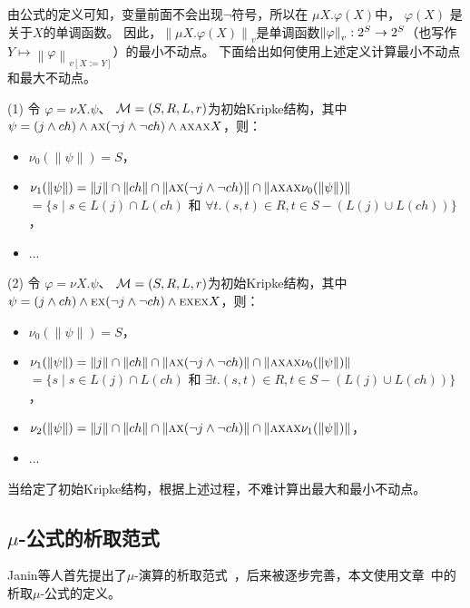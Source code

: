 由公式的定义可知，变量前面不会出现$\neg$符号，所以在 $\mu X. \varphi(X)$中， $\varphi(X)$ 是关于$X$的单调函数。
因此，$\left\| \mu X. \varphi(X)\right\|_v$是单调函数$\left\| \varphi \right\|_{v}: 2^S\rightarrow 2^S$（也写作$Y \mapsto \left\| \varphi\right\|_{v[X:=Y]}$）的最小不动点。
下面给出如何使用上述定义计算最小不动点和最大不动点。
\begin{example}
	(1) 令 $\varphi=\nu X. \psi$、 ${\cal M}=(S, R, L,r)$为初始Kripke结构，其中$\psi = (j \wedge ch) \wedge \textsc{a}\textsc{x} (\neg j \wedge \neg ch) \wedge \textsc{a}\textsc{x} \textsc{a}\textsc{x} X$，则：
	\begin{itemize}
		\item $\nu_0(\left\| \psi \right\|) = S$，
		\item $\nu_1(\left\| \psi \right\|) = \left\| j \right\| \cap \left\| ch \right\| \cap \left\| \textsc{a}\textsc{x} (\neg j \wedge \neg ch) \right\| \cap \left\| \textsc{a}\textsc{x} \textsc{a}\textsc{x} \nu_0(\left\| \psi \right\|) \right\|$ $=\{s \mid s \in L(j) \cap L(ch)$ 和 $\forall t. (s, t) \in R, t \in S - (L(j) \cup L(ch))\}$，
		\item ...
	\end{itemize}
	(2) 令 $\varphi=\nu X. \psi$、 ${\cal M}=(S, R, L,r)$为初始Kripke结构，其中$\psi=(j \wedge ch) \wedge \textsc{e}\textsc{x} (\neg j \wedge \neg ch) \wedge \textsc{e}\textsc{x} \textsc{e}\textsc{x} X$，则：
	\begin{itemize}
		\item $\nu_0(\left\| \psi \right\|) = S$，
		\item $\nu_1(\left\| \psi \right\|) = \left\| j \right\| \cap \left\| ch \right\| \cap \left\| \textsc{a}\textsc{x} (\neg j \wedge \neg ch) \right\| \cap \left\| \textsc{a}\textsc{x} \textsc{a}\textsc{x} \nu_0(\left\| \psi \right\|) \right\|$ $=\{s \mid s \in L(j) \cap L(ch)$ 和 $\exists t. (s, t) \in R, t \in S - (L(j) \cup L(ch))\}$，
		\item $\nu_2(\left\| \psi \right\|) = \left\| j \right\| \cap \left\| ch \right\| \cap \left\| \textsc{a}\textsc{x} (\neg j \wedge \neg ch) \right\| \cap \left\| \textsc{a}\textsc{x} \textsc{a}\textsc{x} \nu_1(\left\| \psi \right\|) \right\|$，
		\item ...
	\end{itemize}
当给定了初始Kripke结构，根据上述过程，不难计算出最大和最小不动点。
\end{example}


\subsection{$\mu$-公式的析取范式}
Janin等人首先提出了$\mu$-演算的析取范式~\cite{janin1995automata}，后来被逐步完善，本文使用文章~\cite{d2006modal}中的析取$\mu$-公式的定义。

